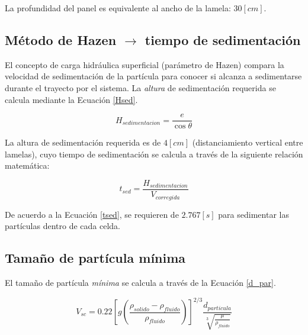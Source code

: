 \noindent
\justify

La profundidad del panel es equivalente al ancho de la lamela: $30 [cm]$.


\subsection{M\'etodo de Hazen $\rightarrow$ tiempo de sedimentaci\'on}

\noindent
\justify

El concepto de carga hidr\'aulica superficial (par\'ametro de Hazen) compara la velocidad de sedimentaci\'on de la part\'icula para conocer si alcanza a sedimentarse durante el trayecto por el sistema. La \textit{altura} de sedimentaci\'on requerida se calcula mediante la Ecuaci\'on \ref{Hsed}.

\begin{equation}
	H_{sedimentacion} = \frac{e}{\cos \theta}
	\label{Hsed}
\end{equation} 

\noindent
\justify

La altura de sedimentaci\'on requerida es de $4 [cm]$ (distanciamiento vertical entre lamelas), cuyo tiempo de sedimentaci\'on se calcula a trav\'es de la siguiente relaci\'on matem\'atica:

\begin{equation}
	t_{sed} = \frac{H_{sedimentacion}}{V_{corregida}}
	\label{tsed}
\end{equation}

\noindent
\justify

De acuerdo a la Ecuaci\'on \ref{tsed}, se requieren de $2.767 [s]$ para sedimentar las part\'iculas dentro de cada celda.

\subsection{Tama\~no de part\'icula m\'inima}

\noindent
\justify

El tama\~no de part\'icula \textit{m\'inima} se calcula a trav\'es de la Ecuaci\'on \ref{d_par}.

\begin{equation}
	V_{sc} = 0.22 \left[g \left( \frac{\rho _{solido} - \rho _{fluido}}{\rho _{fluido}} \right) \right] ^{2/3} \frac{d_{particula}}{\sqrt[3]{\frac{\mu}{\rho _{fluido}}}}
	\label{d_par}
\end{equation}

\noindent
\justify

